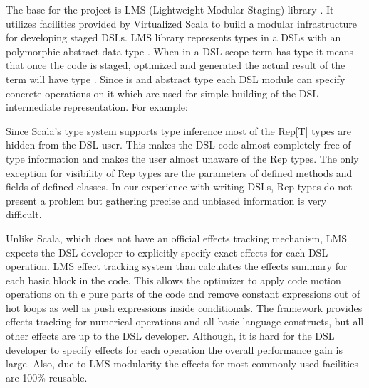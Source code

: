 The base for the \tool project is LMS (Lightweight Modular Staging) library . It utilizes facilities provided by Virtualized Scala to build a modular infrastructure for developing staged DSLs. LMS library represents types in a DSLs with an polymorphic abstract data type . When in a DSL scope term has type  it means that once the code is staged, optimized and generated the actual result of the term will have type .  Since  is and abstract type each DSL module can specify concrete operations on it which are used for simple building of the DSL intermediate representation. For example: 

 
Since Scala's type system supports type inference  most of the Rep[T] types are hidden from the DSL user. This makes the DSL code almost completely free of type information and makes the user almost unaware of the Rep types. The only exception for visibility of Rep types are the parameters of defined methods and fields of defined classes. In our experience with writing DSLs, Rep types do not present a problem but gathering precise and unbiased information is very difficult. 

Unlike Scala, which does not have an official effects tracking mechanism, LMS expects the DSL developer to explicitly specify exact effects for each DSL operation. LMS effect tracking system than calculates the effects summary for each basic block in the code. This allows the optimizer to apply code motion operations on th e pure parts of the code and remove constant expressions out of hot loops as well as push expressions inside conditionals. The framework provides effects tracking for numerical operations and all basic language constructs, but all other effects are up to the DSL developer. Although, it is hard for the DSL developer to specify effects for each operation the overall performance gain is large. Also, due to LMS modularity the effects for most commonly used facilities are 100\% reusable.


